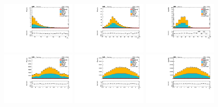 \begin{figure}[tb]
	\begin{center}
		\includegraphics[width=0.32\textwidth]{fig/selection/kinematics/sc_all_kin_phoPt_valid_ptwei_cat0.pdf}
		\includegraphics[width=0.32\textwidth]{fig/selection/kinematics/sc_all_kin_lepPt1_valid_ptwei_cat0.pdf}
		\includegraphics[width=0.32\textwidth]{fig/selection/kinematics/sc_all_kin_lepPt2_valid_ptwei_cat0.pdf}\\
		\includegraphics[width=0.32\textwidth]{fig/selection/kinematics/sc_all_kin_phoeta_valid_ptwei_cat0.pdf}
		\includegraphics[width=0.32\textwidth]{fig/selection/kinematics/sc_all_kin_lepeta1_valid_ptwei_cat0.pdf}
		\includegraphics[width=0.32\textwidth]{fig/selection/kinematics/sc_all_kin_lepeta1_valid_ptwei_cat0.pdf}\\

\end{center}
\end{figure}
